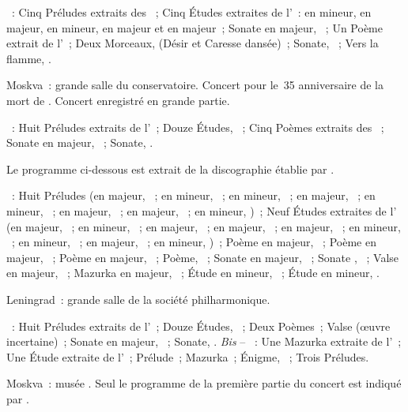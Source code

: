 \begin{description}
 \textsc{\Scriabine{}}~: Cinq Préludes extraits des ~; Cinq Études extraites de l'~:  en \kF \Sharp
 mineur,  en \kF \Sharp majeur,  en \kC \Sharp mineur,
  en \kD \Flat majeur et  en \kE \Flat majeur~; Sonate
 en \kF \Sharp majeur, ~; Un Poème extrait de l'~; Deux
 Morceaux,  (Désir et Caresse dansée)~; Sonate, ~; Vers la
 flamme, .
 \item[\DateWithWeekDay{1950-05-19}]
 Moskva~: grande salle du conservatoire.
 Concert pour le~35\ieme{} anniversaire de la mort de \Scriabine{}.
 Concert enregistré en grande partie.

 \textsc{\Scriabine{}}~: Huit Préludes extraits de l'~; Douze
 Études, ~; Cinq Poèmes extraits des ~; Sonate en \kF \Sharp majeur, ~; Sonate, .

 Le programme ci-dessous est extrait de la discographie établie par
 \citet[p.~29]{Nikonovich11} \citep[voir aussi][p.~392]{Scriabine}.

 \textsc{\Scriabine{}}~: Huit Préludes (en \kC majeur, 
 ~; en \kA mineur,  ~; en \kE mineur, 
 ~; en \kD majeur,  ~; en \kC \Sharp mineur,
  ~; en \kA \Flat majeur,  ~; en
 \kE \Flat majeur,  ~; en \kC mineur, 
 )~; Neuf Études extraites de l' (en \kC \Sharp majeur,
 ~; en \kF \Sharp mineur, ~; en \kB majeur, ~;
 en \kE majeur, ~; en \kA \Flat majeur, ~; en \kB \Flat
 mineur, ~; en \kG \Sharp mineur, ~; en \kD \Flat
 majeur, ~; en \kD \Sharp mineur, )~; Poème en \kD
 majeur,  ~; Poème en \kF \Sharp majeur, 
 ~; Poème en \kC majeur,  ~; Poème, 
 ~; Sonate  en \kF \Sharp majeur, ~; Sonate
 , ~; Valse en \kA \Flat majeur, ~; Mazurka en
 \kF \Sharp majeur,  ~; Étude en \kC \Sharp mineur,
  ~; Étude en \kD \Sharp mineur,  .
 \item[\DateWithWeekDay{1950-06-02}]
 Leningrad~: grande salle de la société philharmonique.

 \textsc{\Scriabine{}}~: Huit Préludes extraits de l'~; Douze
 Études, ~; Deux Poèmes~; Valse (œuvre incertaine)~; Sonate en \kF
 \Sharp majeur, ~; Sonate, .
 \emph{Bis} -- \textsc{\Scriabine{}}~: Une Mazurka extraite de l'~;
 Une Étude extraite de l'~; Prélude~; Mazurka~; Énigme, 
 ~; Trois Préludes.
 \item[\DateWithWeekDay{1950-06-12}]
 Moskva~: musée \Scriabine{}.
 Seul le programme de la première partie du concert est indiqué par
 \citet[p.~432]{Scriabine}.


\end{description}
